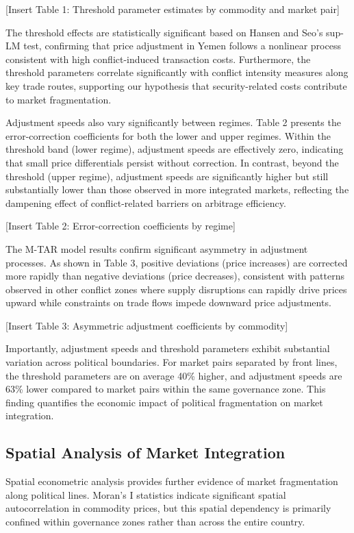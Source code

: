 [Insert Table 1: Threshold parameter estimates by commodity and market pair]

The threshold effects are statistically significant based on Hansen and Seo's sup-LM test, confirming that price adjustment in Yemen follows a nonlinear process consistent with high conflict-induced transaction costs. Furthermore, the threshold parameters correlate significantly with conflict intensity measures along key trade routes, supporting our hypothesis that security-related costs contribute to market fragmentation.

Adjustment speeds also vary significantly between regimes. Table 2 presents the error-correction coefficients for both the lower and upper regimes. Within the threshold band (lower regime), adjustment speeds are effectively zero, indicating that small price differentials persist without correction. In contrast, beyond the threshold (upper regime), adjustment speeds are significantly higher but still substantially lower than those observed in more integrated markets, reflecting the dampening effect of conflict-related barriers on arbitrage efficiency.

[Insert Table 2: Error-correction coefficients by regime]

The M-TAR model results confirm significant asymmetry in adjustment processes. As shown in Table 3, positive deviations (price increases) are corrected more rapidly than negative deviations (price decreases), consistent with patterns observed in other conflict zones where supply disruptions can rapidly drive prices upward while constraints on trade flows impede downward price adjustments.

[Insert Table 3: Asymmetric adjustment coefficients by commodity]

Importantly, adjustment speeds and threshold parameters exhibit substantial variation across political boundaries. For market pairs separated by front lines, the threshold parameters are on average 40\% higher, and adjustment speeds are 63\% lower compared to market pairs within the same governance zone. This finding quantifies the economic impact of political fragmentation on market integration.

\subsection{Spatial Analysis of Market Integration}

Spatial econometric analysis provides further evidence of market fragmentation along political lines. Moran's I statistics indicate significant spatial autocorrelation in commodity prices, but this spatial dependency is primarily confined within governance zones rather than across the entire country.

